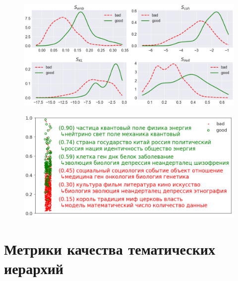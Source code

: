 \begin{figure}[h!]
	\includegraphics[width=\textwidth]{img/metrics_distr.png}
\end{figure}

\begin{figure}[h!]
	\includegraphics[width=\textwidth]{img/metrics_interpr.png}
\end{figure}

\section{Метрики качества тематических иерархий}





